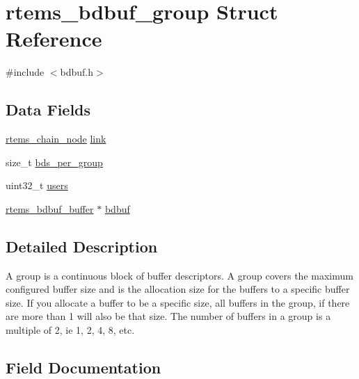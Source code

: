 \hypertarget{structrtems__bdbuf__group}{}\section{rtems\+\_\+bdbuf\+\_\+group Struct Reference}
\label{structrtems__bdbuf__group}


{\ttfamily \#include $<$bdbuf.\+h$>$}

\subsection*{Data Fields}
\begin{DoxyCompactItemize}
\item 
\mbox{\hyperlink{structChain__Node__struct}{rtems\+\_\+chain\+\_\+node}} \mbox{\hyperlink{structrtems__bdbuf__group_ae9b643a68f9d310d91debdc16a67a1d7}{link}}
\item 
size\+\_\+t \mbox{\hyperlink{structrtems__bdbuf__group_aa2685ccbf18c17cf198bc693ad39d88e}{bds\+\_\+per\+\_\+group}}
\item 
uint32\+\_\+t \mbox{\hyperlink{structrtems__bdbuf__group_a6b31ff5ee2f074ce8973f7df789f84c1}{users}}
\item 
\mbox{\hyperlink{structrtems__bdbuf__buffer}{rtems\+\_\+bdbuf\+\_\+buffer}} $\ast$ \mbox{\hyperlink{structrtems__bdbuf__group_a3425969a164f60596a3185ef227d0c92}{bdbuf}}
\end{DoxyCompactItemize}


\subsection{Detailed Description}
A group is a continuous block of buffer descriptors. A group covers the maximum configured buffer size and is the allocation size for the buffers to a specific buffer size. If you allocate a buffer to be a specific size, all buffers in the group, if there are more than 1 will also be that size. The number of buffers in a group is a multiple of 2, ie 1, 2, 4, 8, etc. 

\subsection{Field Documentation}
\mbox{\label{structrtems__bdbuf__group_a3425969a164f60596a3185ef227d0c92}} 
